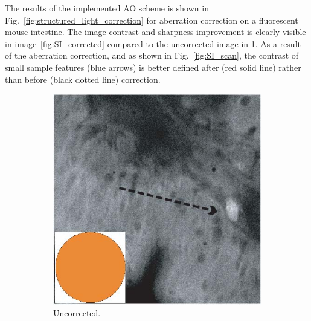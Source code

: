 The results of the implemented AO scheme is shown in Fig.~\ref{fig:structured_light_correction} for aberration correction on a fluorescent mouse intestine. The image contrast and sharpness improvement is clearly visible in image~\ref{fig:SI_corrected} compared to the uncorrected image in \ref{fig:SI_uncorrected}. As a result of the aberration correction, and as shown in Fig.~\ref{fig:SI_scan}, the contrast of small sample features (blue arrows) is better defined after (red solid line) rather than before (black dotted line) correction. 

\begin{figure}[htb]
        \centering
        \begin{subfigure}[b]{0.25\textwidth}
                \includegraphics[width=\textwidth]{images/structured_illumination_uncorrected}
                \caption{Uncorrected.}
                \label{fig:SI_uncorrected}
        \end{subfigure}
        \begin{subfigure}[b]{0.25\textwidth}

\end{subfigure}
\end{figure}
